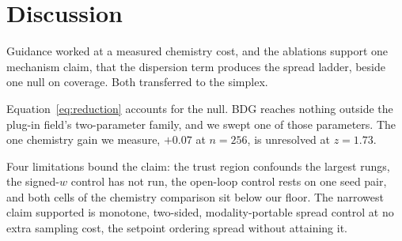 \section{Discussion}

Guidance worked at a measured chemistry cost, and the ablations support one mechanism
claim, that the dispersion term produces the spread ladder, beside one null on
coverage. Both transferred to the simplex.

Equation~\eqref{eq:reduction} accounts for the null. BDG reaches nothing outside the
plug-in field's two-parameter family, and we swept one of those parameters. The one
chemistry gain we measure, $+0.07$ at $n{=}256$, is unresolved at $z=1.73$.

Four limitations bound the claim: the trust region confounds the largest rungs, the
signed-$w$ control has not run, the open-loop control rests on one seed pair, and both
cells of the chemistry comparison sit below our floor. The narrowest claim supported is monotone, two-sided,
modality-portable spread control at no extra sampling cost, the setpoint ordering spread
without attaining it.
